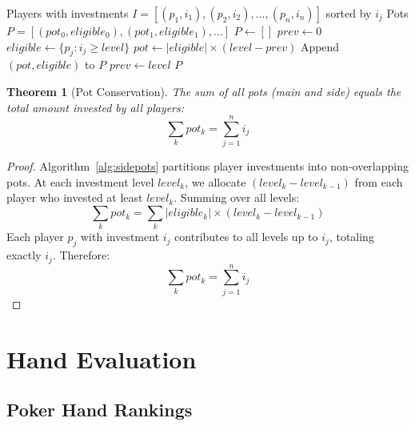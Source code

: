 \documentclass[11pt,a4paper]{article}
\newtheorem{theorem}{Theorem}[section]
\begin{document}
\begin{algorithm}
\caption{Side Pot Calculation}
\label{alg:sidepots}
\begin{algorithmic}[1]
\Require Players with investments $I = [(p_1, i_1), (p_2, i_2), \ldots, (p_n, i_n)]$ sorted by $i_j$
\Ensure Pots $P = [(pot_0, eligible_0), (pot_1, eligible_1), \ldots]$
\State $P \leftarrow []$
\State $prev \leftarrow 0$
    \State $eligible \leftarrow \{p_j : i_j \geq level\}$
    \State $pot \leftarrow |eligible| \times (level - prev)$
    \State Append $(pot, eligible)$ to $P$
    \State $prev \leftarrow level$
\EndFor
\State \Return $P$
\end{algorithmic}
\end{algorithm}

\begin{theorem}[Pot Conservation]
\label{thm:pot-conservation}
The sum of all pots (main and side) equals the total amount invested by all players:
\[
\sum_{k} pot_k = \sum_{j=1}^{n} i_j
\]
\end{theorem}

\begin{proof}
Algorithm~\ref{alg:sidepots} partitions player investments into non-overlapping pots. At each investment level $level_k$, we allocate $(level_k - level_{k-1})$ from each player who invested at least $level_k$. Summing over all levels:
\[
\sum_{k} pot_k = \sum_{k} |eligible_k| \times (level_k - level_{k-1})
\]
Each player $p_j$ with investment $i_j$ contributes to all levels up to $i_j$, totaling exactly $i_j$. Therefore:
\[
\sum_{k} pot_k = \sum_{j=1}^{n} i_j
\]
\end{proof}

\section{Hand Evaluation}
\label{sec:hand-evaluation}

\subsection{Poker Hand Rankings}
\end{document}
